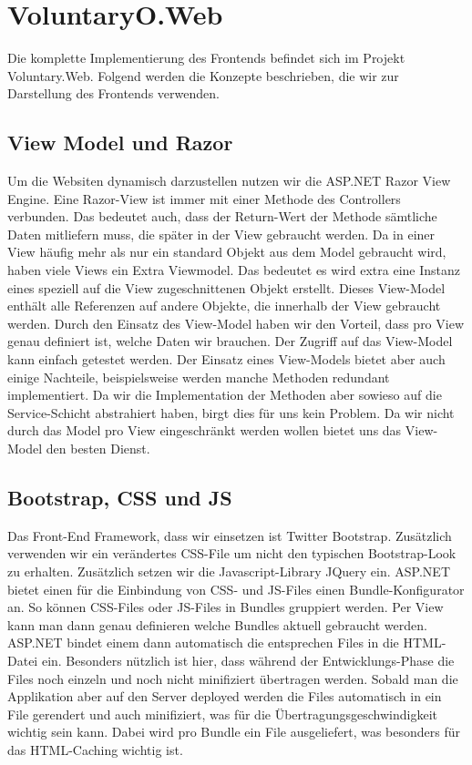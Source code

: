 \section{VoluntaryO.Web}

	Die komplette Implementierung des Frontends befindet sich im Projekt Voluntary.Web. Folgend werden die Konzepte beschrieben, die wir zur Darstellung des Frontends verwenden.

	\subsection{View Model und Razor}
	Um die Websiten dynamisch darzustellen nutzen wir die ASP.NET Razor View Engine. Eine Razor-View ist immer mit einer Methode des Controllers verbunden. Das bedeutet auch, dass der Return-Wert der Methode sämtliche Daten mitliefern muss, die später in der View gebraucht werden. Da in einer View häufig mehr als nur ein standard Objekt aus dem Model gebraucht wird, haben viele Views ein Extra Viewmodel. Das bedeutet es wird extra eine Instanz eines speziell auf die View zugeschnittenen Objekt erstellt. Dieses View-Model enthält alle Referenzen auf andere Objekte, die innerhalb der View gebraucht werden.
	Durch den Einsatz des View-Model haben wir den Vorteil, dass pro View genau definiert ist, welche Daten wir brauchen. Der Zugriff auf das View-Model kann einfach getestet werden.
	Der Einsatz eines View-Models bietet aber auch einige Nachteile, beispielsweise werden manche Methoden redundant implementiert. Da wir die Implementation der Methoden aber sowieso auf die Service-Schicht abstrahiert haben, birgt dies für uns kein Problem.
	Da wir nicht durch das Model pro View eingeschränkt werden wollen bietet uns das View-Model den besten Dienst.

	\subsection{Bootstrap, CSS und JS}
	Das Front-End Framework, dass wir einsetzen ist Twitter Bootstrap. Zusätzlich verwenden wir ein verändertes CSS-File um nicht den typischen Bootstrap-Look zu erhalten.
	Zusätzlich setzen wir die Javascript-Library JQuery ein.
	ASP.NET bietet einen für die Einbindung von CSS- und JS-Files einen Bundle-Konfigurator an. So können CSS-Files oder JS-Files in Bundles gruppiert werden. Per View kann man dann genau definieren welche Bundles aktuell gebraucht werden. ASP.NET bindet einem dann automatisch die entsprechen Files in die HTML-Datei ein.
	Besonders nützlich ist hier, dass während der Entwicklungs-Phase die Files noch einzeln und noch nicht minifiziert übertragen werden. Sobald man die Applikation aber auf den Server deployed werden die Files automatisch in ein File gerendert und auch minifiziert, was für die Übertragungsgeschwindigkeit wichtig sein kann.
	Dabei wird pro Bundle ein File ausgeliefert, was besonders für das HTML-Caching wichtig ist.

